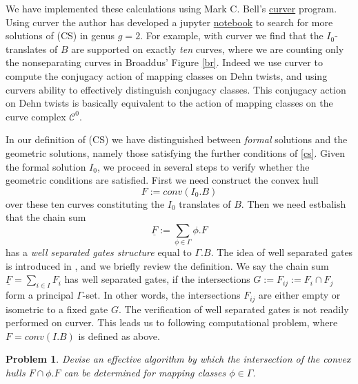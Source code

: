 \documentclass[12pt]{amsart}
\newtheorem*{prob}{Problem}
\theoremstyle{definition}
\theoremstyle{remark}
\newcommand{\uF}{\underline{F}}
\newcommand{\sC}{\mathscr{C}}
\begin{document}
We have implemented these calculations using Mark C. Bell's \href{https://pypi.org/project/curver/}{curver} program. Using curver the author has developed a jupyter \href{https://github.com/jhmartel/MCG/blob/master/2022-06-23-ClosingSteinbergGenusTwo.ipynb}{notebook} to search for more solutions of (CS) in genus $g=2$. For example, with curver we find that the $I_0$-translates of $B$ are supported on exactly \emph{ten} curves, where we are counting only the nonseparating curves in Broaddus' Figure \ref{br}. Indeed we use curver to compute the conjugacy action of mapping classes on Dehn twists, and using curvers ability to effectively distinguish conjugacy classes. This conjugacy action on Dehn twists is basically equivalent to the action of mapping classes on the curve complex $\sC^0$. 


In our definition of (CS) we have distinguished between \emph{formal} solutions and the geometric solutions, namely those satisfying the further conditions of \ref{cs}. Given the formal solution $I_0$, we proceed in several steps to verify whether the geometric conditions are satisfied. First we need construct the convex hull $$F:=conv( I_0.B )$$ over these ten curves constituting the $I_0$ translates of $B$. Then we need estbalish that the chain sum $$\underline{F}:=\sum_{\phi \in \Gamma} \phi.F$$ has a \emph{well separated gates structure} equal to $\Gamma.B$. The idea of well separated gates is introduced in \cite[\S 5.1]{martel}, and we briefly review the definition. We say the chain sum $\uF=\sum_{i\in I} F_i$ has well separated gates, if the intersections $G:=F_{ij}:=F_i\cap F_j$ form a principal $\Gamma$-set. In other words, the intersections $F_{ij}$ are either empty or isometric to a fixed gate $G$. The verification of well separated gates is not readily performed on curver. This leads us to following computational problem, where $F=conv(I.B)$ is defined as above. 

\begin{prob}
Devise an effective algorithm by which the intersection of the convex hulls $F \cap \phi.F$ can be determined for mapping classes $\phi \in \Gamma$.
\end{prob}



\end{document}
